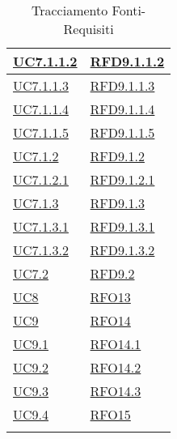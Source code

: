 \begin{longtable}{|>{\centering}m{5cm}|m{5cm}<{\centering}|}
\hyperref[UC7.1.1.2]{UC7.1.1.2} & \hyperlink{RFD9.1.1.2}{RFD9.1.1.2}\\ \hline
\hyperref[UC7.1.1.3]{UC7.1.1.3} & \hyperlink{RFD9.1.1.3}{RFD9.1.1.3}\\ \hline
\hyperref[UC7.1.1.4]{UC7.1.1.4} & \hyperlink{RFD9.1.1.4}{RFD9.1.1.4}\\ \hline
\hyperref[UC7.1.1.5]{UC7.1.1.5} & \hyperlink{RFD9.1.1.5}{RFD9.1.1.5}\\ \hline
\hyperref[UC7.1.2]{UC7.1.2} & \hyperlink{RFD9.1.2}{RFD9.1.2}\\ \hline
\hyperref[UC7.1.2.1]{UC7.1.2.1} & \hyperlink{RFD9.1.2.1}{RFD9.1.2.1}\\ \hline
\hyperref[UC7.1.3]{UC7.1.3} & \hyperlink{RFD9.1.3}{RFD9.1.3}\\ \hline
\hyperref[UC7.1.3.1]{UC7.1.3.1} & \hyperlink{RFD9.1.3.1}{RFD9.1.3.1}\\ \hline
\hyperref[UC7.1.3.2]{UC7.1.3.2} & \hyperlink{RFD9.1.3.2}{RFD9.1.3.2}\\ \hline
\hyperref[UC7.2]{UC7.2} & \hyperlink{RFD9.2}{RFD9.2}\\ \hline
\hyperref[UC8]{UC8} & \hyperlink{RFO13}{RFO13}\\ \hline
\hyperref[UC9]{UC9} & \hyperlink{RFO14}{RFO14}\\ \hline
\hyperref[UC9.1]{UC9.1} & \hyperlink{RFO14.1}{RFO14.1}\\ \hline
\hyperref[UC9.2]{UC9.2} & \hyperlink{RFO14.2}{RFO14.2}\\ \hline
\hyperref[UC9.3]{UC9.3} & \hyperlink{RFO14.3}{RFO14.3}\\ \hline
\hyperref[UC9.4]{UC9.4} & \hyperlink{RFO15}{RFO15}\\ \hline
\caption[Tracciamento Fonti-Requisiti]{Tracciamento Fonti-Requisiti}
\label{tabella:fonti-requi}
\end{longtable}
\clearpage
